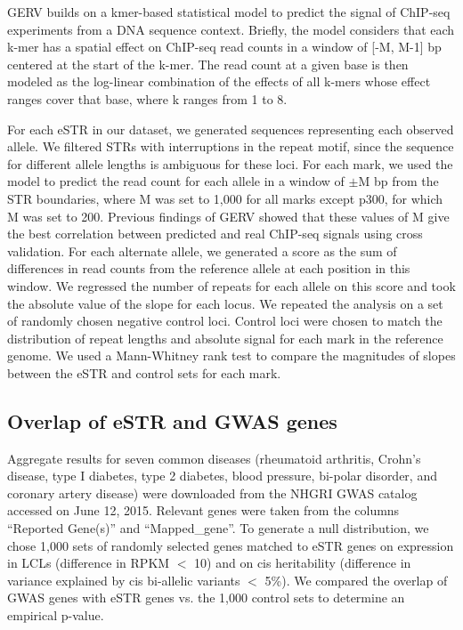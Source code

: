 GERV builds on a kmer-based statistical model to predict the signal of ChIP-seq experiments from a DNA sequence context. Briefly, the model considers that each k-mer has a spatial effect on ChIP-seq read counts in a window of [-M, M-1] bp centered at the start of the k-mer. The read count at a given base is then modeled as the log-linear combination of the effects of all k-mers whose effect ranges cover that base, where k ranges from 1 to 8. 

For each eSTR in our dataset, we generated sequences representing each observed allele. We filtered STRs with interruptions in the repeat motif, since the sequence for different allele lengths is ambiguous for these loci. For each mark, we used the model to predict the read count for each allele in a window of $\pm$M bp from the STR boundaries, where M was set to 1,000 for all marks except p300, for which M was set to 200. Previous findings of GERV showed that these values of M give the best correlation between predicted and real ChIP-seq signals using cross validation. For each alternate allele, we generated a score as the sum of differences in read counts from the reference allele at each position in this window. We regressed the number of repeats for each allele on this score and took the absolute value of the slope for each locus. We repeated the analysis on a set of randomly chosen negative control loci. Control loci were chosen to match the distribution of repeat lengths and absolute signal for each mark in the reference genome. We used a Mann-Whitney rank test to compare the magnitudes of slopes between the eSTR and control sets for each mark.

\subsection{Overlap of eSTR and GWAS genes}
Aggregate results for seven common diseases (rheumatoid arthritis, Crohn's disease, type I diabetes, type 2 diabetes, blood pressure, bi-polar disorder, and coronary artery disease) were downloaded from the NHGRI GWAS catalog accessed on June 12, 2015. Relevant genes were taken from the columns ``Reported Gene(s)'' and ``Mapped\_gene''. To generate a null distribution, we chose 1,000 sets of randomly selected genes matched to eSTR genes on expression in LCLs (difference in RPKM $<$ 10) and on cis heritability (difference in variance explained by cis bi-allelic variants $<$ 5\%). We compared the overlap of GWAS genes with eSTR genes vs. the 1,000 control sets to determine an empirical p-value.


